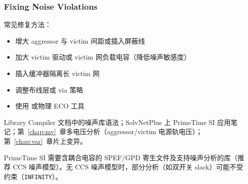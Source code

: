 \subsubsection*{Fixing Noise Violations}

常见修复方法：
\begin{itemize}
  \item 增大 aggressor 与 victim 间距或插入屏蔽线
  \item 加大 victim 驱动或 victim 网负载电容（降低噪声敏感度）
  \item 插入缓冲器隔离长 victim 网
  \item 调整布线层或 via 策略
  \item 使用  或物理 ECO 工具
\end{itemize}

\begin{seeAlsoBox}
Library Compiler 文档中的噪声库语法；SolvNetPlus 上 PrimeTime SI 应用笔记；第~\ref{chap:mv}~章多电压分析（aggressor/victim 电源轨电压）；第~\ref{chap:var}~章片上变异。
\end{seeAlsoBox}

\begin{noteBox}
PrimeTime SI 需要含耦合电容的 SPEF/GPD 寄生文件及支持噪声分析的库（推荐 CCS 噪声模型）。无 CCS 噪声模型时，部分分析（如双开关 slack）可能不受约束（\texttt{INFINITY}）。
\end{noteBox}
